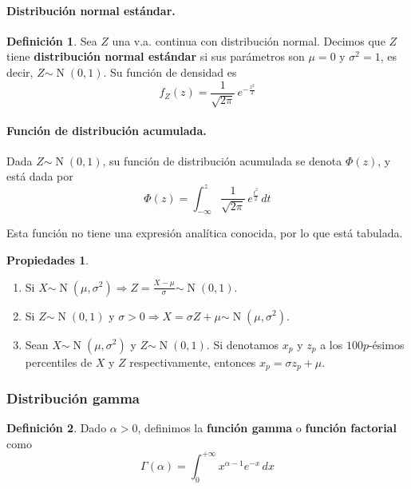 \documentclass[11pt]{article}
\theoremstyle{plain}
\theoremstyle{definition}
\newtheorem*{defi}{Definición}
\newtheorem*{props}{Propiedades}
\theoremstyle{remark}
\newcommand{\deft}[1]{\textbf{#1}}  %
\newcommand{\dist}[1]{\ensuremath{\sim \operatorname{#1}}}  %
\begin{document}
      \paragraph{Distribución normal estándar.}
      \begin{defi}
        Sea $Z$ una v.a. continua con distribución normal. Decimos que $Z$ tiene \deft{distribución normal estándar} si sus parámetros son $\mu = 0$ y $\sigma^2 = 1$, es decir, $Z \dist{N}(0,1)$. Su función de densidad es
        \[ f_Z(z) = \frac{1}{\sqrt{2\pi}} \, e^{- \frac{z^2}{2}} \]
      \end{defi}

      \paragraph{Función de distribución acumulada.}
      Dada $Z \dist{N}(0,1)$, su función de distribución acumulada se denota $\Phi(z)$, y está dada por
      \[ \Phi(z) = \int_{- \infty}^z \frac{1}{\sqrt{2\pi}} \, e^{\frac{t^2}{2}} \, dt \]

      Esta función no tiene una expresión analítica conocida, por lo que está tabulada.

      \begin{props} \
        \begin{enumerate}
          \item Si $X \dist{N}(\mu,\sigma^2) \Rightarrow Z = \frac{X - \mu}{\sigma}\dist{N}(0,1)$.
          \item Si $Z\dist{N}(0,1)$ y $\sigma > 0 \Rightarrow X = \sigma Z + \mu \dist{N}(\mu,\sigma^2)$.
          \item Sean $X\dist{N}(\mu,\sigma^2)$ y $Z\dist{N}(0,1)$. Si denotamos $x_p$ y $z_p$ a los $100 p$-ésimos percentiles de $X$ y $Z$ respectivamente, entonces $x_p = \sigma z_p + \mu$.
        \end{enumerate}
      \end{props}

    \subsubsection{Distribución gamma}

      \begin{defi}
        Dado $\alpha > 0$, definimos la \deft{función gamma} o \deft{función factorial} como
        \[ \Gamma(\alpha) = \int_0^{+ \infty} x^{\alpha - 1} e^{- x} \, dx \]
      \end{defi}
\end{document}
